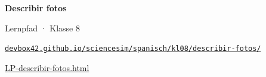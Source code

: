 \documentclass[a4paper]{article}
\begin{document}
\begin{center}

\vspace*{2cm}

{\Huge\bfseries\textcolor{spanisch}{Describir fotos}}

\vspace{0.5cm}

{\Large Lernpfad · Klasse 8}

\vspace{2cm}

\href{https://devbox42.github.io/sciencesim/spanisch/kl08/describir-fotos/LP-describir-fotos.html}{}

\vspace{1.5cm}

\href{https://devbox42.github.io/sciencesim/spanisch/kl08/describir-fotos/LP-describir-fotos.html}{\large\texttt{devbox42.github.io/sciencesim/spanisch/kl08/describir-fotos/}}

\vspace{0.5cm}

\href{https://devbox42.github.io/sciencesim/spanisch/kl08/describir-fotos/LP-describir-fotos.html}{\normalsize LP-describir-fotos.html}

\end{center}
\end{document}
